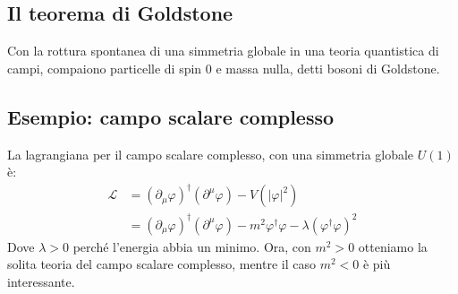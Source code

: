 \documentclass[italian,a4paper]{article}
\theoremstyle{definition}
\newcommand{\lagr}{\ensuremath{\mathscr{L}}}
\begin{document}
\subsection{Il teorema di Goldstone}
Con la rottura spontanea di una simmetria globale in una teoria quantistica
di campi, compaiono particelle di spin $0$ e massa nulla, detti bosoni di
Goldstone.
\subsection*{Esempio: campo scalare complesso}
La lagrangiana per il campo scalare complesso, con una simmetria globale
$U(1)$ \`e:
\begin{align*}
    \lagr &= (\partial_\mu \varphi)^\dagger (\partial^\mu \varphi) -
    V(|\varphi|^2)\\
    &= (\partial_\mu \varphi)^\dagger (\partial^\mu \varphi) -
    m^2\varphi^\dagger\varphi - \lambda (\varphi^\dagger \varphi)^2
\end{align*}
Dove $\lambda > 0$ perch\'e l'energia abbia un minimo. Ora, con $m^2 > 0$
otteniamo la solita teoria del campo scalare complesso, mentre il caso
$m^2 < 0$ \`e pi\`u interessante.
\end{document}
